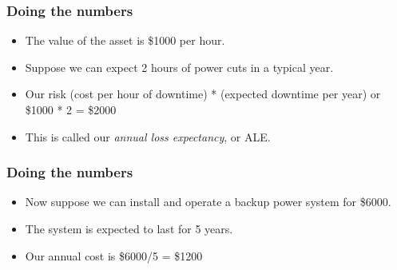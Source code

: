 \documentclass[10pt]{beamer}
\begin{document}
\begin{frame}
	\frametitle{Doing the numbers}

	\begin{itemize}
		\item The value of the asset is \$1000 per hour.
		\item Suppose we can expect 2 hours of power cuts in a typical year.
		\item Our risk (cost per hour of downtime) * (expected downtime per year)
			or \$1000 * 2 = \$2000
		\item This is called our \emph{annual loss expectancy}, or ALE.

	\end{itemize}
\end{frame}

\begin{frame}
	\frametitle{Doing the numbers}

	\begin{itemize}
		\item Now suppose we can install and operate
			a backup power system for \$6000.
		\item The system is expected to last for 5 years.
		\item Our annual cost is \$6000/5 = \$1200
		
	\end{itemize}
\end{frame}
\end{document}
